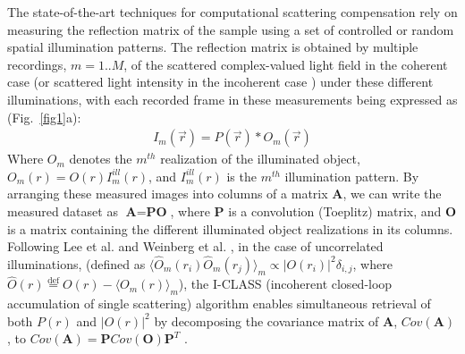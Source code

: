 \documentclass[pdflatex,sn-mathphys-num]{sn-jnl}%
\theoremstyle{thmstyleone}%
\theoremstyle{thmstyletwo}%
\theoremstyle{thmstylethree}%
\begin{document}
The state-of-the-art techniques for computational scattering compensation rely on measuring the reflection matrix of the sample using a set of controlled  \cite{kang17,lambert20, badon2020distortion} or random \cite{lee22,weinberg2023noninvasive,sunray2024beyond} spatial illumination patterns. 
The reflection matrix is obtained by multiple recordings, $m=1..M$, of the scattered complex-valued light field in the coherent case (or scattered light intensity in the incoherent case \cite{weinberg2023noninvasive}) under these different illuminations, with each recorded frame in these measurements being expressed as (Fig.~\ref{fig1}a):
\begin{eqnarray}
I_{m}(\vec{r}) = P(\vec{r}) \ast O_{m} (\vec{r})
\label{eq:2}
\end{eqnarray} 
Where $O_{m}$ denotes the $m^{th}$ realization of the illuminated object, $O_m(r)=O(r)I^{ill}_m(r)$, and $I^{ill}_m(r)$ is the $m^{th}$ illumination pattern.
By arranging these measured images into columns of a matrix $\textbf{A}$, we can write the measured dataset as $\textbf{A} = \textbf{P}\textbf{O}$, where $\textbf{P}$ is a convolution (Toeplitz) matrix, and $\textbf{O}$ is a matrix containing the different illuminated object realizations in its columns. 
Following Lee et al. and Weinberg et al. \cite{lee22,weinberg2023noninvasive}, in the case of uncorrelated illuminations, (defined as $ \langle{ \hat{O}_m(r_i)\hat{O}_m(r_j)\rangle_m}\propto |O(r_i)|^2\delta_{i,j}$, where $\hat{O}(r)\stackrel{\text{def}} =O(r)-\langle{O}_m(r)\rangle_m$), the I-CLASS (incoherent closed-loop accumulation of single scattering) algorithm \cite{weinberg2023noninvasive} enables simultaneous retrieval of both $P(r)$ and $|O(r)|^2$ by decomposing the covariance matrix of $\textbf{A}$, $Cov(\textbf{A})$, to $Cov(\textbf{A}) =\textbf{P}Cov(\textbf{O}) \textbf{P}^T$ \cite{lee22, weinberg2023noninvasive}.


\end{document}

